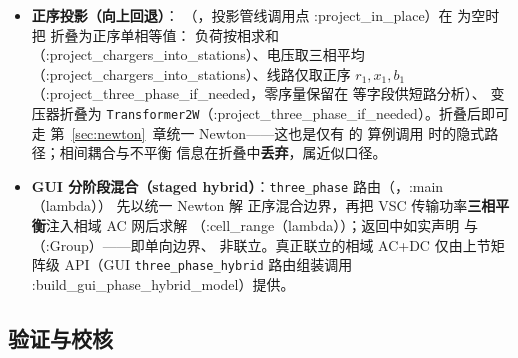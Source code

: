 \begin{itemize}
  \item \textbf{正序投影（向上回退）}：
        （，投影管线调用点 :project\_in\_place）在
         为空时把  折叠为正序单相等值：
        负荷按相求和（:project\_chargers\_into\_stations）、电压取三相平均（:project\_chargers\_into\_stations）、线路仅取正序
        $r_1,x_1,b_1$（:project\_three\_phase\_if\_needed，零序量保留在  等字段供短路分析）、
        变压器折叠为 \texttt{Transformer2W}（:project\_three\_phase\_if\_needed）。折叠后即可走
        第~\ref{sec:newton}~章统一 Newton——这也是仅有  的
        算例调用  时的隐式路径；相间耦合与不平衡
        信息在折叠中\textbf{丢弃}，属近似口径。
  \item \textbf{GUI 分阶段混合（staged hybrid）}：\texttt{three\_phase} 路由（，:main（lambda））
        先以统一 Newton 解
        正序混合边界，再把 VSC 传输功率\textbf{三相平衡}注入相域 AC 网后求解
        （:cell\_range（lambda））；返回中如实声明
         与
        （:Group）——即单向边界、
        非联立。真正联立的相域 AC+DC 仅由上节矩阵级 API（GUI
        \texttt{three\_phase\_hybrid} 路由组装调用 :build\_gui\_phase\_hybrid\_model）提供。
\end{itemize}

\subsection{验证与校核}

